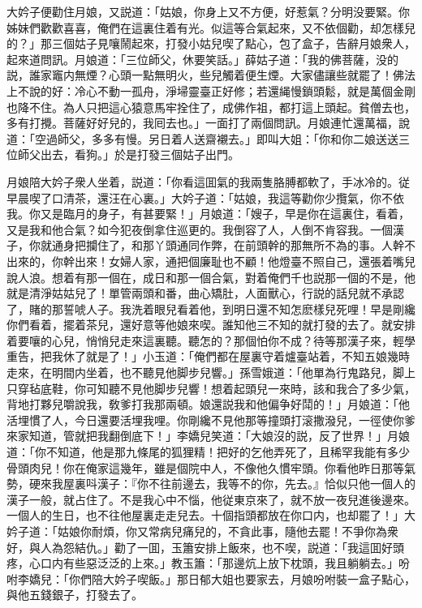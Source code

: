 大妗子便勸住月娘，又説道：「姑娘，你身上又不方便，好惹氣？分明没要緊。你姊妹們歡歡喜喜，俺們在這裏住着有光。似這等合氣起來，又不依個勸，却怎樣兒的？」那三個姑子見嚷鬧起來，打發小姑兒喫了點心，包了盒子，告辭月娘衆人，起來道問訊。月娘道：「三位師父，休要笑話。」薛姑子道：「我的佛菩薩，没的説，誰家竈内無煙？心頭一點無明火，些兒觸着便生煙。大家儘讓些就罷了！佛法上不說的好：冷心不動一孤舟，淨埽靈臺正好修；若還䋲慢鎖頭鬆，就是萬個金剛也降不住。為人只把這心猿意馬牢拴住了，成佛作祖，都打這上頭起。貧僧去也，多有打攪。菩薩好好兒的，我囘去也。」一面打了兩個問訊。月娘連忙還萬福，說道：「空過師父，多多有慢。另日着人送齋襯去。」即叫大姐：「你和你二娘送送三位師父出去，看狗。」於是打發三個姑子出門。

月娘陪大妗子衆人坐着，説道：「你看這囬氣的我兩隻胳膊都軟了，手冰冷的。従早晨喫了口清茶，還汪在心裏。」大妗子道：「姑娘，我這等勸你少攬氣，你不依我。你又是臨月的身子，有甚要緊！」月娘道：「嫂子，早是你在這裏住，看着，又是我和他合氣？如今犯夜倒拿住巡更的。我倒容了人，人倒不肯容我。一個漢子，你就通身把攔住了，和那丫頭通同作弊，在前頭幹的那無所不為的事。人幹不出來的，你幹出來！女婦人家，通把個廉耻也不顧！他燈臺不照自己，還張着嘴兒說人浪。想着有那一個在，成日和那一個合氣，對着俺們千也説那一個的不是，他就是清淨姑姑兒了！單管兩頭和番，曲心矯肚，人面獸心，行説的話兒就不承認了，賭的那誓唬人子。我洗着眼兒看着他，到明日還不知怎麽樣兒死哩！早是剛纔你們看着，擺着茶兒，還好意等他娘來喫。誰知他三不知的就打發的去了。就安排着要嚷的心兒，悄悄兒走來這裏聽。聽怎的？那個怕你不成？待等那漢子來，輕學重告，把我休了就是了！」小玉道：「俺們都在屋裏守着爐臺站着，不知五娘幾時走來，在明間内坐着，也不聽見他脚步兒響。」孫雪娥道：「他單為行鬼路兒，脚上只穿毡底鞋，你可知聽不見他脚步兒響！想着起頭兒一來時，該和我合了多少氣，背地打夥兒嚼說我，敎爹打我那兩頓。娘還説我和他偏争好鬦的！」月娘道：「他活埋慣了人，今日還要活埋我哩。你剛纔不見他那等撞頭打滚撒潑兒，一徑使你爹來家知道，管就把我翻倒底下！」李嬌兒笑道：「大娘沒的説，反了世界！」月娘道：「你不知道，他是那九條尾的狐狸精！把好的乞他弄死了，且稀罕我能有多少骨頭肉兒！你在俺家這幾年，雖是個院中人，不像他久慣牢頭。你看他昨日那等氣勢，硬來我屋裏呌漢子：『你不往前邊去，我等不的你，先去。』恰似只他一個人的漢子一般，就占住了。不是我心中不惱，他従東京來了，就不放一夜兒進後邊來。一個人的生日，也不往他屋裏走走兒去。十個指頭都放在你口内，也却罷了！」大妗子道：「姑娘你耐煩，你又常病兒痛兒的，不貪此事，隨他去罷！不爭你為衆好，與人為怨結仇。」勸了一囬，玉簫安排上飯來，也不喫，説道：「我這囬好頭疼，心口内有些惡泛泛的上來。」教玉簫：「那邊炕上放下枕頭，我且躺躺去。」吩咐李嬌兒：「你們陪大妗子喫飯。」那日郁大姐也要家去，月娘吩咐裝一盒子點心，與他五錢銀子，打發去了。

